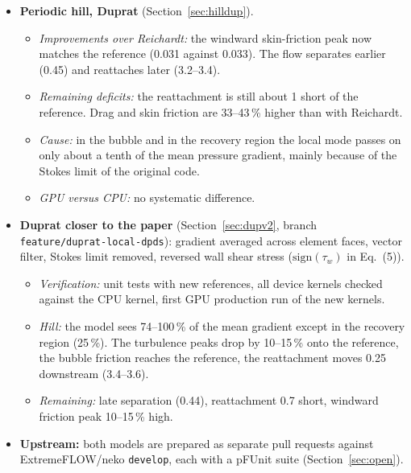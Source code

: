 \documentclass[11pt,a4paper]{article}
\newcommand{\code}[1]{\texttt{#1}}
\begin{document}
\begin{itemize}
\begin{itemize}
        reattaches early ($x/h \approx 2.7$--2.8, reference 4.2--4.5).
        This is consistent with an equilibrium wall model that ignores the
        adverse pressure gradient at the crest, together with a coarse
        wall-normal resolution there.
      \item \emph{GPU versus CPU:} the runs agree in the mean flow, the skin
        friction and the separation point. The shear-layer turbulence was
        higher on the GPU. The Duprat runs, made with the same builds, do not
        show this, so it is probably not a code-path difference. A
        deterministic restart test is prepared to settle it.
    \end{itemize}
  \item \textbf{Periodic hill, Duprat} (Section~\ref{sec:hilldup}).
    \begin{itemize}
      \item \emph{Improvements over Reichardt:} the windward skin-friction
        peak now matches the reference (0.031 against 0.033). The flow
        separates earlier (0.45) and reattaches later (3.2--3.4).
      \item \emph{Remaining deficits:} the reattachment is still about 1
        short of the reference. Drag and skin friction are 33--43\,\%
        higher than with Reichardt.
      \item \emph{Cause:} in the bubble and in the recovery region the local
        mode passes on only about a tenth of the mean pressure gradient,
        mainly because of the Stokes limit of the original code.
      \item \emph{GPU versus CPU:} no systematic difference.
    \end{itemize}
  \item \textbf{Duprat closer to the paper} (Section~\ref{sec:dupv2},
    branch \code{feature/duprat-local-dpds}): gradient averaged across
    element faces, vector filter, Stokes limit removed, reversed wall shear
    stress ($\mathrm{sign}(\tau_w)$ in Eq.~(5)).
    \begin{itemize}
      \item \emph{Verification:} unit tests with new references, all
        device kernels checked against the CPU kernel, first GPU production
        run of the new kernels.
      \item \emph{Hill:} the model sees 74--100\,\% of the mean gradient
        except in the recovery region (25\,\%). The turbulence peaks drop by
        10--15\,\% onto the reference, the bubble friction reaches the
        reference, the reattachment moves 0.25 downstream (3.4--3.6).
      \item \emph{Remaining:} late separation (0.44), reattachment 0.7
        short, windward friction peak 10--15\,\% high.
    \end{itemize}
  \item \textbf{Upstream:} both models are prepared as separate pull
    requests against ExtremeFLOW/neko \code{develop}, each with a pFUnit
    suite (Section~\ref{sec:open}).
\end{itemize}
\end{document}
